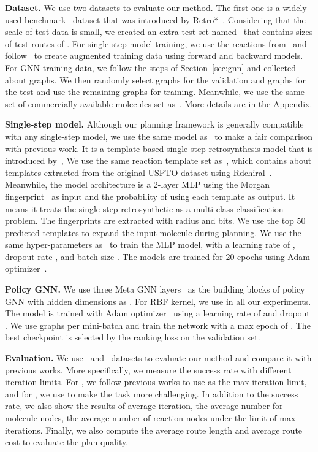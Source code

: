 \documentclass[sigconf]{acmart}
\begin{document}
\textbf{Dataset.}
We use two datasets to evaluate our method. The first one is a widely used benchmark \uspto~dataset that was introduced by Retro*~\citep{Chen2020}.
Considering that the scale of test data is small, we created an extra test set named \usptoext~that contains  sizes of test routes of \uspto.
For single-step model training, we use the  reactions from~\citet{Chen2020} and follow~\citep{Kim2021} to create augmented training data using forward and backward models.
For GNN training data, we follow the steps of Section~\ref{sec:gnn} and collected about  graphs.
We then randomly select  graphs for the validation and  graphs for the test and use the remaining graphs for training.
Meanwhile, we use the same set of commercially available molecules set as~\cite{Chen2020,Kim2021}.
More details are in the Appendix.

\noindent\textbf{Single-step model.}
Although our planning framework is generally compatible with any single-step model,
we use the same model as~\citet{Chen2020, Kim2021} to make a fair comparison with previous work.
It is a template-based single-step retrosynthesis model that is introduced by~\citet{segler2017towards},
We use the same reaction template set as~\citet{Chen2020}, which contains about  templates extracted from the original USPTO dataset using Rdchiral~\citep{coley2019rdchiral}.
Meanwhile, the model architecture is a 2-layer MLP using the Morgan fingerprint~\citep{rogers2010extended} as input and the probability of using each template as output.
It means it treats the single-step retrosynthetic as a multi-class classification problem.
The fingerprints are extracted with radius  and  bits.
We use the top 50 predicted templates to expand the input molecule during planning.
We use the same hyper-parameters as~\citet{Kim2021} to train the MLP model, with a learning rate of , dropout rate , and batch size .
The models are trained for 20 epochs using Adam optimizer~\citep{kingma2014adam}.

\noindent\textbf{Policy GNN.}
We use three Meta GNN layers~\cite{battaglia2018relational} as the building blocks of policy GNN with hidden dimensions as .
For RBF kernel, we use  in all our experiments.
The model is trained with Adam optimizer~\citep{kingma2014adam} using a learning rate of  and dropout .
We use  graphs per mini-batch and train the network with a max epoch of .
The best checkpoint is selected by the ranking loss on the validation set.


\noindent\textbf{Evaluation.}
We use \uspto~and \usptoext~datasets to evaluate our method and compare it with previous works.
More specifically, we measure the success rate with different iteration limits.
For \uspto, we follow previous works to use  as the max iteration limit, and for \usptoext, we use  to make the task more challenging.
In addition to the success rate, we also show the results of average iteration, the average number for molecule nodes, the average number of reaction nodes under the limit of max iterations.
Finally, we also compute the average route length and average route cost to evaluate the plan quality.
\end{document}

